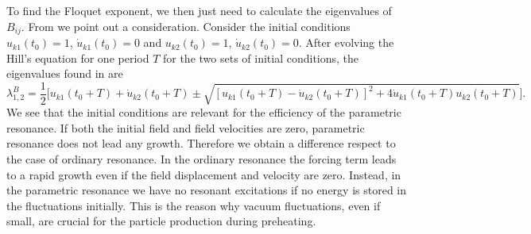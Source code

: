\documentclass[11pt,a4paper,twoside]{book}
\begin{document}
To find the Floquet exponent, we then just need to calculate the eigenvalues of $ B_{ij} $. From \cite{Chap4:Lozanov} we point out a consideration. Consider the initial conditions $ u_{k1}(t_{0}) = 1 $, $ \dot{u}_{k1}(t_{0})=0 $ and $ u_{k2}(t_{0}) = 1 $, $ \dot{u}_{k2}(t_{0})=0 $. After evolving the Hill's equation for one period $ T $ for the two sets of initial conditions, the eigenvalues found in \cite{Chap4:Lozanov} are 
\begin{equation}
\lambda_{1,2}^{B}=\frac{1}{2}\Bigg[u_{k1}(t_{0} + T) + \dot{u}_{k2}(t_{0} + T)  \pm \sqrt{[u_{k1}(t_{0} + T) - \dot{u}_{k2}(t_{0} + T)]^{2} + 4\dot{u}_{k1}(t_{0}+T)u_{k2}(t_{0} + T)}\Bigg].
\end{equation}
We see that the initial conditions are relevant for the efficiency of the parametric resonance. If both the initial field and field velocities are zero, parametric resonance does not lead any growth. Therefore we obtain a difference respect to the case of ordinary resonance. In the ordinary resonance the forcing term leads to a rapid growth even if the field displacement and velocity are zero. Instead, in the parametric resonance we have no resonant excitations if no energy is stored in the fluctuations initially. This is the reason why vacuum fluctuations, even if small, are crucial for the particle production during preheating.\\
\end{document}
